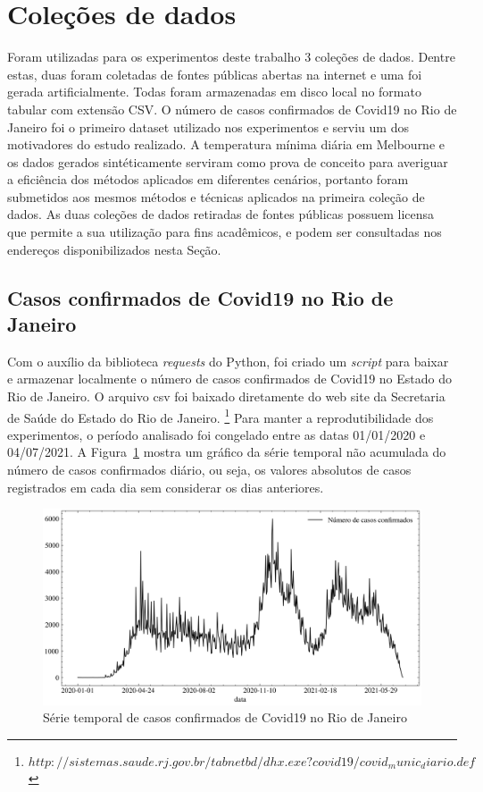 \section{Coleções de dados}
Foram utilizadas para os experimentos deste trabalho 3 coleções de dados. Dentre estas, duas foram coletadas de fontes públicas abertas na internet e uma foi gerada artificialmente. Todas foram armazenadas em disco local no formato tabular com extensão CSV. O número de casos confirmados de Covid19 no Rio de Janeiro foi o primeiro dataset utilizado nos experimentos e serviu um dos motivadores do estudo realizado. A temperatura mínima diária em Melbourne e os dados gerados sintéticamente serviram como prova de conceito para averiguar a eficiência dos métodos aplicados em diferentes cenários, portanto foram submetidos aos mesmos métodos e técnicas aplicados na primeira coleção de dados. As duas coleções de dados retiradas de fontes públicas possuem licensa que permite a sua utilização para fins acadêmicos, e podem ser consultadas nos endereços disponibilizados nesta Seção.

\subsection{Casos confirmados de Covid19 no Rio de Janeiro} \label{subsec:casos_confirmados}
Com o auxílio da biblioteca \textit{requests} do Python, foi criado um \textit{script} para baixar e armazenar localmente o número de casos confirmados de Covid19 no Estado do Rio de Janeiro. O arquivo csv foi baixado diretamente do web site da Secretaria de Saúde do Estado do Rio de Janeiro. \footnote{$http://sistemas.saude.rj.gov.br/tabnetbd/dhx.exe?covid19/covid_munic_diario.def$} Para manter a reprodutibilidade dos experimentos, o período analisado foi congelado entre as datas 01/01/2020 e 04/07/2021. A Figura~\ref{fig:casos_confirmados} mostra um gráfico da série temporal não acumulada do número de casos confirmados diário, ou seja, os valores absolutos de casos registrados em cada dia sem considerar os dias anteriores.

\begin{figure}[!htp] \label{fig:casos_confirmados}
    \centering
    \includegraphics[width=5.0in]{img/casos_confirmados.png}
    \caption{Série temporal de casos confirmados de Covid19 no Rio de Janeiro}
\end{figure}

